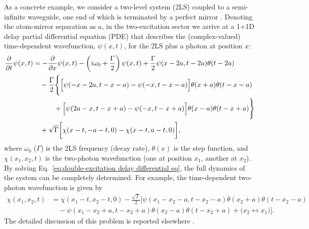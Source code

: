 \documentclass[12pt,letter,onecolumn,notitlepage]{article}
\begin{document}
As a concrete example, we consider a two-level system (2LS) coupled to a semi-infinite waveguide, one end of which is terminated by a perfect mirror \cite{FangPRA15, FangNM17}. Denoting the atom-mirror separation as $a$, in the two-excitation sector we arrive at a 1+1D delay partial differential equation (PDE) that describes the (complex-valued) time-dependent wavefunction, $\psi(x,t)$, for the 2LS plus a photon at position $x$:
\begin{equation}
\begin{aligned}
\frac{\partial}{\partial t}\psi(x,t)&=-\frac{\partial}{\partial x}\psi(x,t)-\left(i\omega_0+\frac{\Gamma}{2}\right)\psi(x,t)+\frac{\Gamma}{2}\psi(x-2a, t-2a)\theta(t-2a)  \\
&\quad- \frac{\Gamma}{2}\Biggl\{\Bigl[\psi(- x- 2a, t- x- a) - \psi(- x, t- x- a)\Bigr]\theta(x+a)\theta(t- x- a)\\
&\quad\quad\quad +\Bigl[\psi(2a- x, t- x+ a)- \psi(- x, t- x+a)\Bigr]\theta(x- a)\theta(t- x+ a)\Biggr\} \\
&\quad+\sqrt{\Gamma}\biggl[\chi(x-t,-a-t,0)-\chi(x-t,a-t,0)\biggr],
\end{aligned}\label{eq:double-excitation delay differential eq}
\end{equation}
where $\omega_0$ ($\Gamma$) is the 2LS frequency (decay rate), $\theta(x)$ is the step function, and $\chi(x_1, x_2,t )$ is the two-photon wavefunction (one at position $x_1$, another at $x_2$). By solving Eq.~\eqref{eq:double-excitation delay differential eq}, the full dynamics of the system can be completely determined. For example, the time-dependent two-photon wavefunction is given by  
\begin{equation}
\begin{aligned}
\chi(x_1, x_2, t)& = \chi(x_1-t, x_2-t, 0)-\frac{\sqrt{\Gamma}}{2}\biggl[
\psi(x_1-x_2-a, t-x_2-a)\theta(x_2+a)\theta(t-x_2-a)\\
&\quad
-\psi(x_1-x_2+a, t-x_2+a)\theta(x_2-a)\theta(t-x_2+a) +\bigl(x_2 \leftrightarrow x_1\bigr)
\biggr].
\label{eq:formal solution of two-photon wavefunction}
\end{aligned}
\end{equation}
The detailed discussion of this problem is reported elsewhere \cite{FangNM17}.
\end{document}
